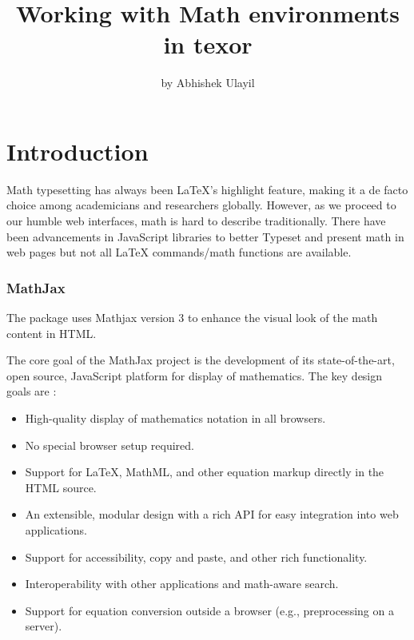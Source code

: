 \title{Working with Math environments in texor}
\author{by Abhishek Ulayil}

\maketitle


\section{Introduction}
Math typesetting has always been LaTeX’s highlight feature, making it a de facto choice among academicians and researchers globally. However, as we proceed to our humble web interfaces, math is hard to describe traditionally. There have been advancements in JavaScript libraries to better Typeset and present math in web pages but not all LaTeX commands/math functions are available.

\subsubsection{MathJax}
The  package uses Mathjax version 3 to enhance the visual look of the math content in HTML.

The core goal of the MathJax project is the development of its state-of-the-art, open source, JavaScript platform for display of mathematics. The key design goals are \citep{mathjax}:
\begin{itemize}
    \item High-quality display of mathematics notation in all browsers.
    \item No special browser setup required.
    \item Support for LaTeX, MathML, and other equation markup directly in the HTML source.
    \item An extensible, modular design with a rich API for easy integration into web applications.
    \item Support for accessibility, copy and paste, and other rich functionality.
    \item Interoperability with other applications and math-aware search.
    \item Support for equation conversion outside a browser (e.g., preprocessing on a server).
\end{itemize}

